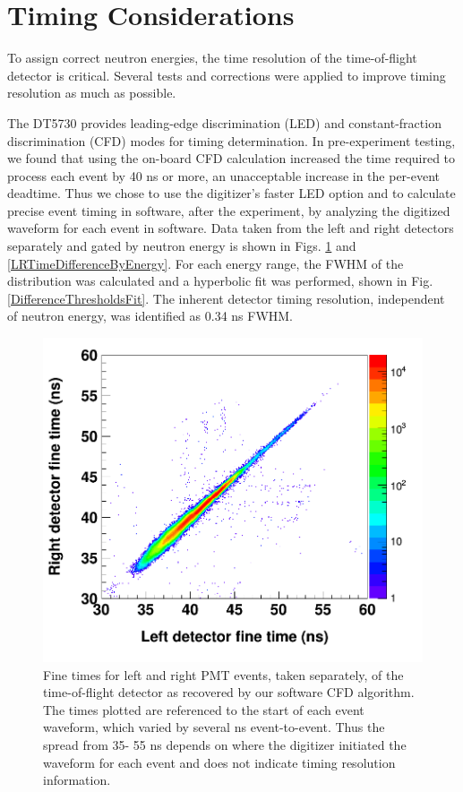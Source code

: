 \section{Timing Considerations}
To assign correct neutron energies, the time resolution of the time-of-flight
detector is critical. Several tests and corrections were applied to improve
timing resolution as much as possible.

The DT5730 provides leading-edge discrimination (LED) and constant-fraction discrimination
(CFD) modes for timing determination. In pre-experiment testing, we found that using the
on-board CFD calculation increased the time required to process each event by 40
ns or more, an unacceptable increase in the per-event deadtime. Thus we chose
to use the digitizer's faster LED option and to calculate precise event timing
in software, after the experiment, by analyzing the digitized waveform for each event in
software. Data taken from the left and right detectors separately and gated by neutron energy 
is shown in Figs. \ref{LRCorrelation} and \ref{LRTimeDifferenceByEnergy}. 
For each energy range, the FWHM of the distribution was calculated and a hyperbolic fit was
performed, shown in Fig. \ref{DifferenceThresholdsFit}. The inherent detector timing resolution,
independent of neutron energy, was identified as 0.34 ns FWHM.

\begin{figure}
    \includegraphics[scale=0.3]{figures/LRCorrelation.png}
    \caption[Event times for left and right PMTs of time-of-flight detector]
    {Fine times for left and right PMT events, taken separately, of the time-of-flight 
        detector as recovered by our software CFD algorithm. The times plotted are referenced
        to the start of each event waveform, which varied by several ns event-to-event.
        Thus the spread from 35-
        55 ns depends on where the digitizer initiated the waveform for each
        event and does not indicate timing resolution information.}
    \label{LRCorrelation}
\end{figure}

